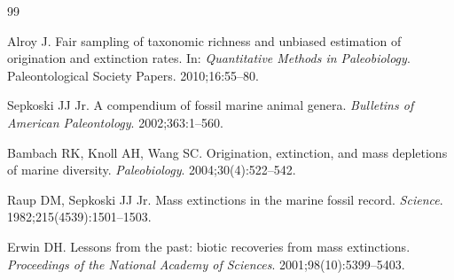\begin{thebibliography}{99}

Alroy J. Fair sampling of taxonomic richness and unbiased estimation of origination and extinction rates. In: \emph{Quantitative Methods in Paleobiology}. Paleontological Society Papers. 2010;16:55--80.

Sepkoski JJ Jr. A compendium of fossil marine animal genera. \emph{Bulletins of American Paleontology}. 2002;363:1--560.

Bambach RK, Knoll AH, Wang SC. Origination, extinction, and mass depletions of marine diversity. \emph{Paleobiology}. 2004;30(4):522--542.

Raup DM, Sepkoski JJ Jr. Mass extinctions in the marine fossil record. \emph{Science}. 1982;215(4539):1501--1503.

Erwin DH. Lessons from the past: biotic recoveries from mass extinctions. \emph{Proceedings of the National Academy of Sciences}. 2001;98(10):5399--5403.

\end{thebibliography}

